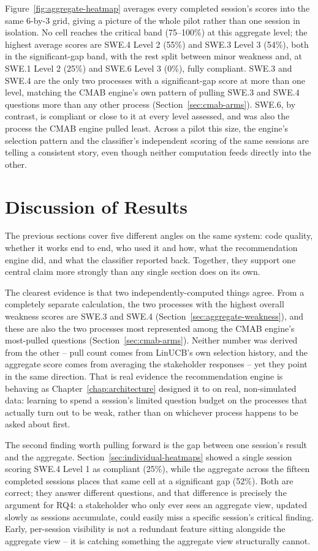 \documentclass[a4paper, 12pt, oneside, openany, BCOR1cm,toc=chapterentrywithdots]{scrbook}
\begin{document}
Figure~\ref{fig:aggregate-heatmap} averages every completed session's scores into the same
6-by-3 grid, giving a picture of the whole pilot rather than one session in isolation. No cell
reaches the critical band (75--100\%) at this aggregate level; the highest average scores are
SWE.4 Level 2 (55\%) and SWE.3 Level 3 (54\%), both in the significant-gap band, with the rest
split between minor weakness and, at SWE.1 Level 2 (25\%) and SWE.6 Level 3 (0\%), fully
compliant. SWE.3 and SWE.4 are the only two processes with a significant-gap score at more than
one level, matching the CMAB engine's own pattern of pulling SWE.3 and SWE.4 questions more than
any other process (Section~\ref{sec:cmab-arms}). SWE.6, by contrast, is compliant or close to it
at every level assessed, and was also the process the CMAB engine pulled least. Across a pilot
this size, the engine's selection pattern and the classifier's independent scoring of the same
sessions are telling a consistent story, even though neither computation feeds directly into the
other.

\section{Discussion of Results}

The previous sections cover five different angles on the same system: code quality, whether it
works end to end, who used it and how, what the recommendation engine did, and what the
classifier reported back. Together, they support one central claim more strongly than any single
section does on its own.

The clearest evidence is that two independently-computed things agree. From a completely
separate calculation, the two processes with the highest overall weakness scores are SWE.3 and
SWE.4 (Section~\ref{sec:aggregate-weakness}), and these are also the two processes most
represented among the CMAB engine's most-pulled questions (Section~\ref{sec:cmab-arms}). Neither
number was derived from the other -- pull count comes from LinUCB's own selection history, and
the aggregate score comes from averaging the stakeholder responses -- yet they point in the same
direction. That is real evidence the recommendation engine is behaving as
Chapter~\ref{chap:architecture} designed it to on real, non-simulated data: learning to spend a
session's limited question budget on the processes that actually turn out to be weak, rather
than on whichever process happens to be asked about first.

The second finding worth pulling forward is the gap between one session's result and the
aggregate. Section~\ref{sec:individual-heatmaps} showed a single session scoring SWE.4 Level 1
as compliant (25\%), while the aggregate across the fifteen completed sessions places that same
cell at a significant gap (52\%). Both are correct; they answer different questions, and that
difference is precisely the argument for RQ4: a stakeholder who only ever sees an aggregate
view, updated slowly as sessions accumulate, could easily miss a specific session's critical
finding. Early, per-session visibility is not a redundant feature sitting alongside the
aggregate view -- it is catching something the aggregate view structurally cannot.
\end{document}
